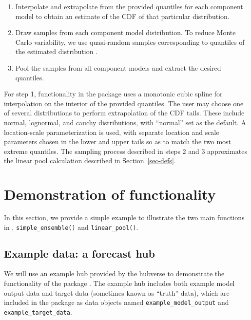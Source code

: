 \documentclass[
  article,
  shortnames,
  notitle]{jss}
\providecommand{\tightlist}{%
  \setlength{\itemsep}{0pt}\setlength{\parskip}{0pt}}\usepackage{longtable,booktabs,array}
\begin{document}
\begin{enumerate}
\def\labelenumi{\arabic{enumi}.}
\tightlist
\item
  Interpolate and extrapolate from the provided quantiles for each
  component model to obtain an estimate of the CDF of that particular
  distribution.
\item
  Draw samples from each component model distribution. To reduce Monte
  Carlo variability, we use quasi-random samples corresponding to
  quantiles of the estimated distribution
  \citep{niederreiter1992quasirandom}.
\item
  Pool the samples from all component models and extract the desired
  quantiles.
\end{enumerate}

For step 1, functionality in the  package uses a
monotonic cubic spline for interpolation on the interior of the provided
quantiles. The user may choose one of several distributions to perform
extrapolation of the CDF tails. These include normal, lognormal, and
cauchy distributions, with ``normal'' set as the default. A
location-scale parameterization is used, with separate location and
scale parameters chosen in the lower and upper tails so as to match the
two most extreme quantiles. The sampling process described in steps 2
and 3 approximates the linear pool calculation described in
Section~\ref{sec-defs}.

\section{Demonstration of functionality}\label{sec-simple-ex}

In this section, we provide a simple example to illustrate the two main
functions in , \texttt{simple\_ensemble()} and
\texttt{linear\_pool()}.

\subsection{Example data: a forecast
hub}\label{example-data-a-forecast-hub}

We will use an example hub provided by the hubverse to demonstrate the
functionality of the  package \citep{hubverse_docs}.
The example hub includes both example model output data and target data
(sometimes known as ``truth'' data), which are included in the
 package as data objects named
\texttt{example\_model\_output} and \texttt{example\_target\_data}.
\end{document}
